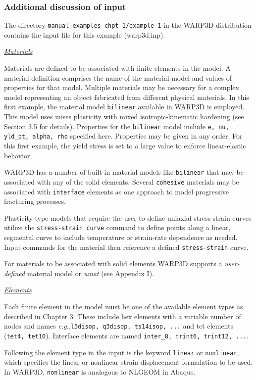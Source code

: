 \documentclass[11pt]{report}
\numberwithin{equation}{section}
\newcommand{\ttt} {\texttt}  %
\newcommand{\ul} {\underline}
\newcommand{\eg}{\emph{e.g.},\xspace}
\newcommand{\ti}{\emph}
\newcommand{\nid}{\noindent}
\begin{document}
{\subsubsection{Additional discussion of input}


\nid The directory \ttt{manual\_examples\_chpt\_1/example\_1} in the WARP3D
distribution contains the input file for this example (warp3d.inp).

\nid \ti{\ul{Materials} }

\nid  Materials are defined to be associated with finite elements in the model. A material definition
comprises the name of the material model and values of properties for that model. Multiple
materials may be necessary for a complex model representing an object
fabricated from different physical materials. In this first example, the material model \ttt{bilinear} available in
WARP3D is employed. This model uses mises plasticity with mixed isotropic-kinematic
 hardening (see Section 3.5 for details).  Properties for the \ttt{bilinear} model include
 \ttt{e, nu, yld\_pt, alpha, rho} specified here. Properties may be given in any order.
 For this first example, the yield stress is set to
 a large value to enforce linear-elastic behavior.
 
WARP3D has a number of built-in material models like \ttt{bilinear} that may be associated with any
of the solid elements. Several \ttt{cohesive} materials may be associated with \ttt{interface}
elements as one approach to model progressive fracturing processes. 

Plasticity type models that require the user to define uniaxial stress-strain curves utilize the
\ttt{stress-strain curve} command to define points along a linear, segmental curve to include temperature
or strain-rate dependence as needed. Input commands for the material then reference a defined \ttt{stress-strain}
curve.

For materials to be associated with solid elements WARP3D supports a \ti{user-defined} material model or
\ti{umat} (see Appendix I).

\nid \ti{\ul{Elements} } 

\nid Each finite element in the model must be one of the available
element types as described in Chapter 3. These include hex
elements with a variable number of nodes and names \eg \ttt{l3disop, q3disop, ts14isop, ...} and tet elements
(\ttt{tet4, tet10}). Interface elements are named \ttt{inter\_8, trint6, trint12, ...}.

Following the element type in the input is the keyword \ttt{linear} or \ttt{nonlinear}, which specifies the
linear or nonlinear strain-displacement formulation to be used. In WARP3D, \ttt{nonlinear} is analogous to 
NLGEOM in Abaqus.

}
\end{document}
